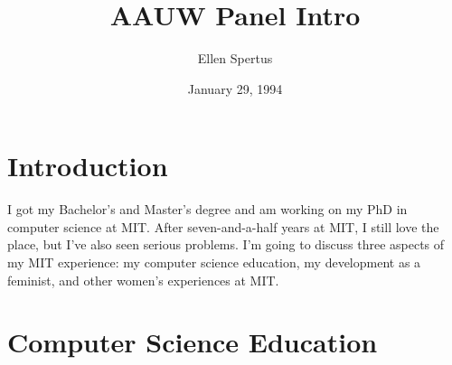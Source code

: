 

\title{AAUW Panel Intro}
\author{Ellen Spertus}
\date{January 29, 1994}
\maketitle

\section{Introduction}

I got my Bachelor's and Master's degree and am working on my PhD in
computer science at MIT.  After seven-and-a-half years at MIT, I still
love the place, but I've also seen serious problems.  I'm going to
discuss three aspects of my MIT experience: my computer science
education, my development as a feminist, and other women's experiences
at MIT.

\section{Computer Science Education}


